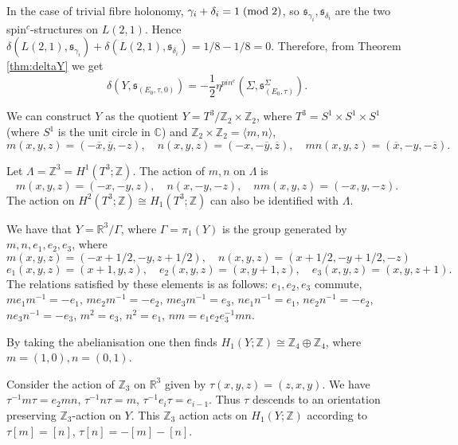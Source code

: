 \documentclass{amsart}
\theoremstyle{definition}
\theoremstyle{remark}
\numberwithin{equation}{section}
\begin{document}
In the case of trivial fibre holonomy, $\gamma_i + \delta_i = 1 \; ({\rm mod} \; 2)$, so $\mathfrak{s}_{\gamma_i} , \mathfrak{s}_{\delta_i}$ are the two spin$^c$-structures on $L(2,1)$. Hence $\delta(L(2,1) , \mathfrak{s}_{\gamma_i}) + \delta( L(2,1) , \mathfrak{s}_{\delta_i}) = 1/8 - 1/8 = 0$. Therefore, from Theorem \ref{thm:deltaY} we get
\begin{equation}\label{equ:deltaeta}
\delta(Y , \mathfrak{s}_{(E_0,\tau,0)}) = -\frac{1}{2} \eta^{pin^{c}}(\Sigma , \mathfrak{s}^{\Sigma}_{(E_0 , \tau)}).
\end{equation}

We can construct $Y$ as the quotient $Y = T^3/ \mathbb{Z}_2 \times \mathbb{Z}_2$, where $T^3 = S^1 \times S^1 \times S^1$ (where $S^1$ is the unit circle in $\mathbb{C}$) and $\mathbb{Z}_2 \times \mathbb{Z}_2 = \langle m,n \rangle$,
\[
m(x,y,z) = (-\overline{x} , \overline{y} , -z), \quad n(x,y,z) = ( -x , -\overline{y} , \overline{z} ), \quad mn(x,y,z) = (\overline{x} , -y , -\overline{z}).
\]

Let $\Lambda = \mathbb{Z}^3 = H^1(T^3 ; \mathbb{Z})$. The action of $m,n$ on $\Lambda$ is
\[
m(x,y,z) = (-x,-y,z), \quad n(x,-y,-z), \quad nm(x,y,z) = (-x,y,-z).
\]
The action on $H^2(T^3 ; \mathbb{Z}) \cong H_1(T^3 ; \mathbb{Z})$ can also be identified with $\Lambda$.

We have that $Y = \mathbb{R}^3/\Gamma$, where $\Gamma = \pi_1(Y)$ is the group generated by $m,n,e_1,e_2,e_3$, where
\[
m(x,y,z) = (-x + 1/2 , -y , z+1/2), \quad n(x,y,z) = (x+1/2 , -y+1/2 , -z)
\]
\[
e_1(x,y,z) = (x+1,y,z), \quad e_2(x,y,z) = (x,y+1,z), \quad e_3(x,y,z) = (x,y,z+1).
\]
The relations satisfied by these elements is as follows: $e_1,e_2,e_3$ commute, $me_1m^{-1} = -e_1$, $m e_2 m^{-1} = -e_2$, $me_3 m^{-1} = e_3$, $ne_1n^{-1} = e_1$, $ne_2n^{-1} = -e_2$, $ne_3 n^{-1} = -e_3$, $m^2 = e_3$, $n^2 = e_1$, $nm = e_1e_2e_3^{-1} mn$.

By taking the abelianisation one then finds $H_1(Y ; \mathbb{Z}) \cong \mathbb{Z}_4 \oplus \mathbb{Z}_4$, where $m = (1,0), n = (0,1)$.

Consider the action of $\mathbb{Z}_3$ on $\mathbb{R}^3$ given by $\tau(x,y,z) = (z,x,y)$. We have $\tau^{-1} m \tau = e_2 mn$, $\tau^{-1}n \tau = m$, $\tau^{-1}e_i \tau = e_{i-1}$. Thus $\tau$ descends to an orientation preserving $\mathbb{Z}_3$-action on $Y$. This $\mathbb{Z}_3$ action acts on $H_1(Y ; \mathbb{Z})$ according to $\tau [m] = [n]$, $\tau[n] = -[m]-[n]$.
\end{document}
